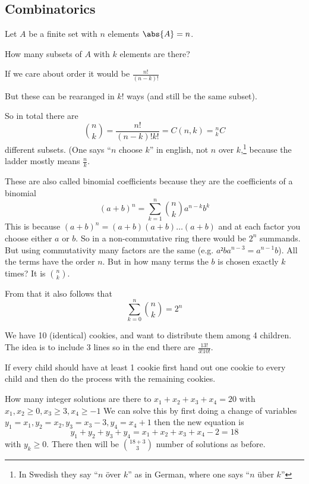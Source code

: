 \documentclass[english]{lbscript}
\begin{document}
\subsection{Combinatorics}
\label{sec:combinatorics}

Let \(A\) be a finite set with \(n\) elements \(\abs{A}=n\).

How many subsets of \(A\) with \(k\) elements are there?

If we care about order it would be \(\frac{n!}{(n-k)!}\)

But these can be rearanged in \(k!\) ways (and still be the same subset).

So in total there are
\begin{equation}
	\label{eq:1}
	\binom{n}{k} = \frac{n!}{(n-k)!k!} = C(n, k) = {}^{n}_{k}C
\end{equation}
different subsets. (One says \enquote{\(n\) choose \(k\)} in english, not \(n\) over \(k\),\footnote{In Swedish they say \enquote{\(n\) över \(k\)} as in German, where one says \enquote{\(n\) über \(k\)}} because the ladder mostly means \(\frac{n}{k}\).

These are also called binomial coefficients because they are the coefficients of a binomial
\begin{equation}
	\label{eq:2}
	(a+b)^{n} = ∑_{k=1}^{n} \binom{n}{k} a^{n-k} b^{k}
\end{equation}
This is because \((a+b)^{n}=(a+b)(a+b)\dots(a+b)\) and at each factor you choose either \(a\) or \(b\). So in a non-commutative ring there would be \(2^{n}\) summands. But using commutativity many factors are the same (e.g. \(a²ba^{n-3}=a^{n-1}b\)). All the terms have the order \(n\). But in how many terms the \(b\) is chosen exactly \(k\) times? It is \(\binom{n}{k}\).

From that it also follows that
\begin{equation}
	\label{eq:3}
	∑_{k=0}^{n} \binom{n}{k} = 2^{n}
\end{equation}

\begin{example}{We have 10 (identical) cookies, and want to distribute them among 4 children.}{}
	The idea is to include 3 lines so in the end there are \(\frac{13!}{3!10!}\).

	If every child should have at least 1 cookie first hand out one cookie to every child and then do the process with the remaining cookies.
\end{example}

\begin{example}{How many integer solutions are there to \(x_1+x_2+ x_3+x_4=20\) with \(x_1,x_2≥0, x_3≥3, x_4≥-1\)}{}
	We can solve this by first doing a change of variables \(y_1=x_1, y_2=x_2, y_3=x_3-3, y_4=x_4+1\) then the new equation is
	\begin{equation}
		\label{eq:4}
		y_1+y_2+y_3+y_4=x_1+x_2+x_3+x_4-2 = 18
	\end{equation}
	with \(y_k≥0\). There then will be \(\binom{18+3}{3}\) number of solutions as before.
\end{example}
\end{document}
